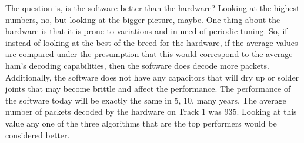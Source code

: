 The question is, is the software better than the hardware? Looking at the highest numbers, no, but looking at the bigger picture, maybe. One thing about the hardware is that it is prone to variations and in need of periodic tuning. So, if instead of looking at the best of the breed for the hardware, if the average values are compared under the presumption that this would correspond to the average ham's decoding capabilities, then the software does decode more packets. Additionally, the software does not have any capacitors that will dry up or solder joints that may become brittle and affect the performance. The performance of the software today will be exactly the same in 5, 10, many years. The average number of packets decoded by the hardware on Track 1 was 935. Looking at this value any one of the three algorithms that are the top performers would be considered better.

